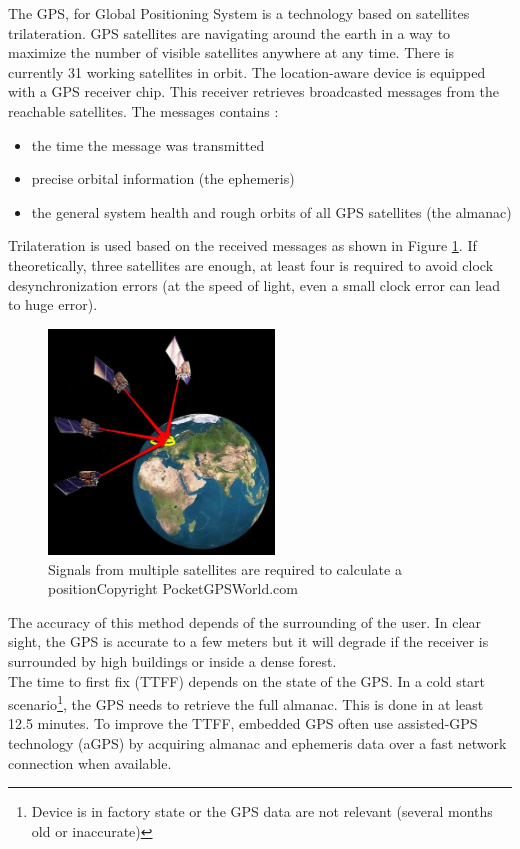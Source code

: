 The GPS, for Global Positioning System is a technology based on satellites trilateration\cite{pocketgpsworld}.
GPS satellites are navigating around the earth in a way to maximize the number of visible satellites anywhere at any time.
There is currently 31 working satellites in orbit.
The location-aware device is equipped with a GPS receiver chip.
This receiver retrieves broadcasted messages from the reachable satellites.
The messages contains :

\begin{itemize}
\item the time the message was transmitted
\item precise orbital information (the ephemeris)
\item the general system health and rough orbits of all GPS satellites (the almanac)
\end{itemize}

Trilateration is used based on the received messages as shown in Figure \ref{fig:gps-earth}.
If theoretically, three satellites are enough, at least four is required to avoid clock desynchronization errors (at the speed of light, even a small clock error can lead to huge error).\\

\begin{figure}[h]
  \centering
  \includegraphics[width=6cm]{images/gps.jpg}
  \caption{Signals from multiple satellites are required to calculate a position\newline Copyright PocketGPSWorld.com}
  \label{fig:gps-earth}
\end{figure}


The accuracy of this method depends of the surrounding of the user.
In clear sight, the GPS is accurate to a few meters but it will degrade if the receiver is surrounded by high buildings or inside a dense forest.\\

The time to first fix (TTFF) depends on the state of the GPS.
In a cold start scenario\footnote{Device is in factory state or the GPS data are not relevant (several months old or inaccurate)}, the GPS needs to retrieve the full almanac.
This is done in at least 12.5 minutes\cite{gpsuser}.
To improve the TTFF, embedded GPS often use assisted-GPS technology (aGPS) by acquiring almanac and ephemeris data over a fast network connection when available.

